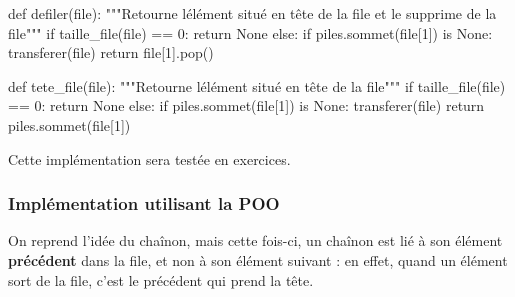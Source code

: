 \documentclass[
  letterpaper,
  DIV=11,
  numbers=noendperiod]{scrartcl}
\newenvironment{Shaded}{\begin{snugshade}}{\end{snugshade}}
\newcommand{\BuiltInTok}[1]{\textcolor[rgb]{0.00,0.23,0.31}{#1}}
\newcommand{\CommentTok}[1]{\textcolor[rgb]{0.37,0.37,0.37}{#1}}
\newcommand{\ControlFlowTok}[1]{\textcolor[rgb]{0.00,0.23,0.31}{#1}}
\newcommand{\DecValTok}[1]{\textcolor[rgb]{0.68,0.00,0.00}{#1}}
\newcommand{\KeywordTok}[1]{\textcolor[rgb]{0.00,0.23,0.31}{#1}}
\newcommand{\NormalTok}[1]{\textcolor[rgb]{0.00,0.23,0.31}{#1}}
\newcommand{\OperatorTok}[1]{\textcolor[rgb]{0.37,0.37,0.37}{#1}}
\newcommand{\VariableTok}[1]{\textcolor[rgb]{0.07,0.07,0.07}{#1}}
\begin{document}
\begin{Shaded}
\begin{Highlighting}[]
\KeywordTok{def}\NormalTok{ defiler(}\BuiltInTok{file}\NormalTok{):}
    \CommentTok{"""Retourne l\textquotesingle{}élément situé en tête de la file et le supprime de la file"""}
    \ControlFlowTok{if}\NormalTok{ taille\_file(}\BuiltInTok{file}\NormalTok{) }\OperatorTok{==} \DecValTok{0}\NormalTok{:}
        \ControlFlowTok{return} \VariableTok{None}
    \ControlFlowTok{else}\NormalTok{:}
        \ControlFlowTok{if}\NormalTok{ piles.sommet(}\BuiltInTok{file}\NormalTok{[}\DecValTok{1}\NormalTok{]) }\KeywordTok{is} \VariableTok{None}\NormalTok{:}
\NormalTok{            transferer(}\BuiltInTok{file}\NormalTok{)}
        \ControlFlowTok{return} \BuiltInTok{file}\NormalTok{[}\DecValTok{1}\NormalTok{].pop()}


\KeywordTok{def}\NormalTok{ tete\_file(}\BuiltInTok{file}\NormalTok{):}
    \CommentTok{"""Retourne l\textquotesingle{}élément situé en tête de la file"""}
    \ControlFlowTok{if}\NormalTok{ taille\_file(}\BuiltInTok{file}\NormalTok{) }\OperatorTok{==} \DecValTok{0}\NormalTok{:}
        \ControlFlowTok{return} \VariableTok{None}
    \ControlFlowTok{else}\NormalTok{:}
        \ControlFlowTok{if}\NormalTok{ piles.sommet(}\BuiltInTok{file}\NormalTok{[}\DecValTok{1}\NormalTok{]) }\KeywordTok{is} \VariableTok{None}\NormalTok{:}
\NormalTok{            transferer(}\BuiltInTok{file}\NormalTok{)}
        \ControlFlowTok{return}\NormalTok{ piles.sommet(}\BuiltInTok{file}\NormalTok{[}\DecValTok{1}\NormalTok{])}
\end{Highlighting}
\end{Shaded}

Cette implémentation sera testée en exercices.

\hypertarget{impluxe9mentation-utilisant-la-poo}{%
\subsubsection{Implémentation utilisant la
POO}\label{impluxe9mentation-utilisant-la-poo}}

On reprend l'idée du chaînon, mais cette fois-ci, un chaînon est lié à
son élément \textbf{précédent} dans la file, et non à son élément
suivant : en effet, quand un élément sort de la file, c'est le précédent
qui prend la tête.
\end{document}
